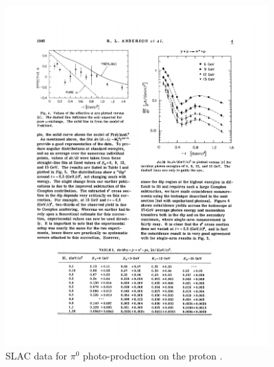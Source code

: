 \begin{figure}
\centering
\includegraphics[width=4in]{figures/SLAC_data.pdf}
\caption{SLAC data for $\pi^0$ photo-production on the proton \cite{Anderson:1971}.}
\label{SLAC}
\end{figure}
